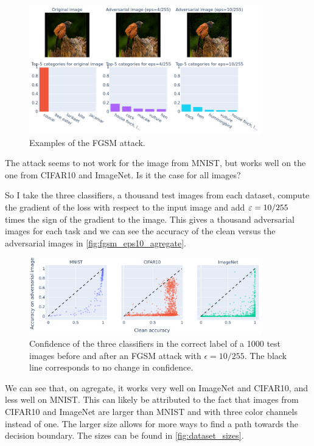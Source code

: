 \documentclass[]{scrarticle}
\begin{document}
\begin{figure}[H]
  \centering
  \includegraphics[width=0.9\textwidth]{images/fgsm_example_ImageNet.png}
  \caption{Examples of the FGSM attack.}
  \label{fig:fgsm_examples_imagenet}
\end{figure}

The attack seems to not work for the image from MNIST, but works well
on the one from CIFAR10 and ImageNet.
Is it the case for all images?

So I take the three classifiers, a thousand test images from each dataset,
compute the gradient of the loss with respect to the input image
and add $\varepsilon = 10 / 255$ times the sign of the gradient to the image.
This gives a thousand adversarial images for each task and
we can see the accuracy of the clean versus the adversarial images
in \autoref{fig:fgsm_eps10_agregate}.

\begin{figure}[H]
  \centering
  \includegraphics[width=0.9\textwidth]{images/fgsm_strength.png}
  \caption{Confidence of the three classifiers in the correct label of
    a 1000 test images before and after an FGSM attack with $\epsilon = 10 / 255$.
    The black line corresponds to no change in confidence.
  }
  \label{fig:fgsm_eps10_agregate}
\end{figure}

We can see that, on agregate, it works very well on ImageNet and CIFAR10,
and less well on MNIST. This can likely be attributed to the fact that
images from CIFAR10 and ImageNet are larger than MNIST and with three
color channels instead of one. The larger size allows for more ways to
find a path towards the decision boundary.
The sizes can be found in \autoref{fig:dataset_sizes}.
\end{document}
